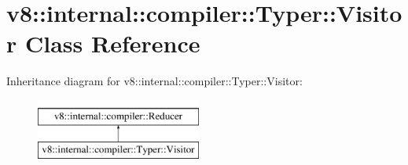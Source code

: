 \hypertarget{classv8_1_1internal_1_1compiler_1_1Typer_1_1Visitor}{}\section{v8\+:\+:internal\+:\+:compiler\+:\+:Typer\+:\+:Visitor Class Reference}
\label{classv8_1_1internal_1_1compiler_1_1Typer_1_1Visitor}
Inheritance diagram for v8\+:\+:internal\+:\+:compiler\+:\+:Typer\+:\+:Visitor\+:\begin{figure}[H]
\begin{center}
\leavevmode
\includegraphics[height=2.000000cm]{classv8_1_1internal_1_1compiler_1_1Typer_1_1Visitor}
\end{center}
\end{figure}
